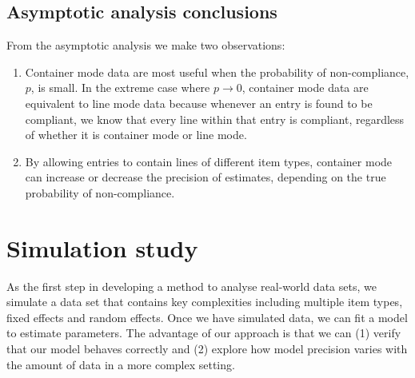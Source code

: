 \documentclass[aoas]{imsart}
\begin{document}
%
%
%
%


\subsection{Asymptotic analysis conclusions}

From the asymptotic analysis we make two observations:
\begin{enumerate}
\item Container mode data are most useful when the probability of non-compliance, \(p\), is small. In the extreme case where \(p\rightarrow 0\), container mode data are equivalent to line mode data because whenever an entry is found to  {be compliant, we know that every line within that entry is compliant}, regardless of whether it is container mode or line mode. 
\item  {By allowing entries to contain lines of different item types, container mode} can increase or decrease the precision of estimates, depending on the true probability of non-compliance.
\end{enumerate}


\section{Simulation study}
As the first step in developing a method to analyse real-world data sets, we simulate a data set that contains key complexities including multiple item types, fixed effects and random effects. Once we have simulated data, we can fit a model to estimate parameters. The advantage of our approach is that we can (1) verify that our model behaves correctly and (2) explore how model precision varies with the amount of data in a more complex setting.
\end{document}
